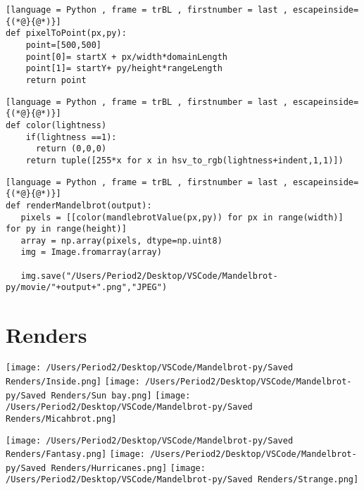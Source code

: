 \documentclass{article}
\begin{document}
\begin{minipage}[t]{0.5\textwidth}
    \begin{lstlisting}[language = Python , frame = trBL , firstnumber = last , escapeinside={(*@}{@*)}]
def pixelToPoint(px,py):
    point=[500,500]
    point[0]= startX + px/width*domainLength
    point[1]= startY+ py/height*rangeLength
    return point
    \end{lstlisting}
\vspace{35pt}
    \begin{lstlisting}[language = Python , frame = trBL , firstnumber = last , escapeinside={(*@}{@*)}]
def color(lightness)
    if(lightness ==1):
      return (0,0,0)
    return tuple([255*x for x in hsv_to_rgb(lightness+indent,1,1)])
    \end{lstlisting}
\vspace{30pt}
\begin{lstlisting}[language = Python , frame = trBL , firstnumber = last , escapeinside={(*@}{@*)}]
def renderMandelbrot(output):
   pixels = [[color(mandlebrotValue(px,py)) for px in range(width)] for py in range(height)]
   array = np.array(pixels, dtype=np.uint8)
   img = Image.fromarray(array)

   img.save("/Users/Period2/Desktop/VSCode/Mandelbrot-py/movie/"+output+".png","JPEG")
            \end{lstlisting}
\end{minipage}
\pagebreak
\section{Renders}
\begin{minipage}[t]{0.45\textwidth}
    \texttt{[image: /Users/Period2/Desktop/VSCode/Mandelbrot-py/Saved Renders/Inside.png]}
    \texttt{[image: /Users/Period2/Desktop/VSCode/Mandelbrot-py/Saved Renders/Sun bay.png]}
    \texttt{[image: /Users/Period2/Desktop/VSCode/Mandelbrot-py/Saved Renders/Micahbrot.png]}
\end{minipage}\hspace{15pt}
\begin{minipage}[t]{0.45\textwidth}
    \texttt{[image: /Users/Period2/Desktop/VSCode/Mandelbrot-py/Saved Renders/Fantasy.png]}
    \texttt{[image: /Users/Period2/Desktop/VSCode/Mandelbrot-py/Saved Renders/Hurricanes.png]}
    \texttt{[image: /Users/Period2/Desktop/VSCode/Mandelbrot-py/Saved Renders/Strange.png]}
\end{minipage}
\end{document}
